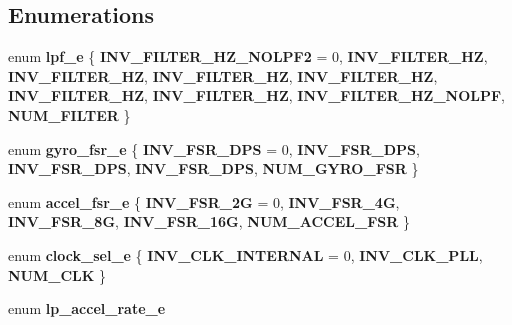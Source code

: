 \subsection*{Enumerations}
\begin{DoxyCompactItemize}
\item 
enum \textbf{ lpf\+\_\+e} \{ \newline
\textbf{ I\+N\+V\+\_\+\+F\+I\+L\+T\+E\+R\+\_\+H\+Z\+\_\+\+N\+O\+L\+P\+F2} = 0, 
\textbf{ I\+N\+V\+\_\+\+F\+I\+L\+T\+E\+R\+\_\+HZ}, 
\textbf{ I\+N\+V\+\_\+\+F\+I\+L\+T\+E\+R\+\_\+HZ}, 
\textbf{ I\+N\+V\+\_\+\+F\+I\+L\+T\+E\+R\+\_\+HZ}, 
\newline
\textbf{ I\+N\+V\+\_\+\+F\+I\+L\+T\+E\+R\+\_\+HZ}, 
\textbf{ I\+N\+V\+\_\+\+F\+I\+L\+T\+E\+R\+\_\+HZ}, 
\textbf{ I\+N\+V\+\_\+\+F\+I\+L\+T\+E\+R\+\_\+HZ}, 
\textbf{ I\+N\+V\+\_\+\+F\+I\+L\+T\+E\+R\+\_\+H\+Z\+\_\+\+N\+O\+L\+PF}, 
\newline
\textbf{ N\+U\+M\+\_\+\+F\+I\+L\+T\+ER}
 \}
\item 
enum \textbf{ gyro\+\_\+fsr\+\_\+e} \{ \newline
\textbf{ I\+N\+V\+\_\+\+F\+S\+R\+\_\+D\+PS} = 0, 
\textbf{ I\+N\+V\+\_\+\+F\+S\+R\+\_\+D\+PS}, 
\textbf{ I\+N\+V\+\_\+\+F\+S\+R\+\_\+D\+PS}, 
\textbf{ I\+N\+V\+\_\+\+F\+S\+R\+\_\+D\+PS}, 
\newline
\textbf{ N\+U\+M\+\_\+\+G\+Y\+R\+O\+\_\+\+F\+SR}
 \}
\item 
enum \textbf{ accel\+\_\+fsr\+\_\+e} \{ \newline
\textbf{ I\+N\+V\+\_\+\+F\+S\+R\+\_\+2G} = 0, 
\textbf{ I\+N\+V\+\_\+\+F\+S\+R\+\_\+4G}, 
\textbf{ I\+N\+V\+\_\+\+F\+S\+R\+\_\+8G}, 
\textbf{ I\+N\+V\+\_\+\+F\+S\+R\+\_\+16G}, 
\newline
\textbf{ N\+U\+M\+\_\+\+A\+C\+C\+E\+L\+\_\+\+F\+SR}
 \}
\item 
enum \textbf{ clock\+\_\+sel\+\_\+e} \{ \textbf{ I\+N\+V\+\_\+\+C\+L\+K\+\_\+\+I\+N\+T\+E\+R\+N\+AL} = 0, 
\textbf{ I\+N\+V\+\_\+\+C\+L\+K\+\_\+\+P\+LL}, 
\textbf{ N\+U\+M\+\_\+\+C\+LK}
 \}
\item 
enum \textbf{ lp\+\_\+accel\+\_\+rate\+\_\+e} 
\end{DoxyCompactItemize}
